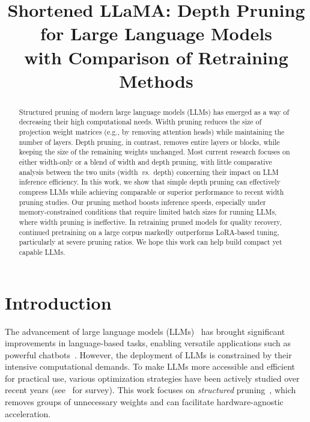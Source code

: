 \title{Shortened LLaMA: Depth Pruning for Large Language Models\\with Comparison of Retraining Methods}



\maketitle
\begin{abstract}
Structured pruning of modern large language models (LLMs) has emerged as a way of decreasing their high computational needs. Width pruning reduces the size of projection weight matrices (e.g., by removing attention heads) while maintaining the number of layers. Depth pruning, in contrast, removes entire layers or blocks, while keeping the size of the remaining weights unchanged. Most current research focuses on either width-only or a blend of width and depth pruning, with little comparative analysis between the two units (width~\textit{vs.}~depth) concerning their impact on LLM inference efficiency. In this work, we show that simple depth pruning can effectively compress LLMs while achieving comparable or superior performance to recent width pruning studies. Our pruning method boosts inference speeds, especially under memory-constrained conditions that require limited batch sizes for running LLMs, where width pruning is ineffective. In retraining pruned models for quality recovery, continued pretraining on a large corpus markedly outperforms LoRA-based tuning, particularly at severe pruning ratios. We hope this work can help build compact yet capable LLMs.
\end{abstract}

\section{Introduction}

The advancement of large language models (LLMs)~\cite{touvron2023llama,openai2023gpt4,chowdhery2022palm,zhang2022opt,scao2022bloom} has brought significant improvements in language-based tasks, enabling versatile applications such as powerful chatbots~\cite{bard,chatgpt}. However, the deployment of LLMs is constrained by their intensive computational demands. To make LLMs more accessible and efficient for practical use, various optimization strategies have been actively studied over recent years (see~\citet{zhu2023survey,wan2023efficient} for survey). This work focuses on \textit{structured} pruning~\cite{fang2023depgraph,li2017pruning}, which removes groups of unnecessary weights and can facilitate hardware-agnostic acceleration. 

